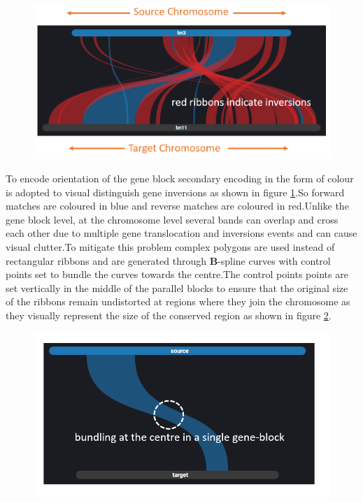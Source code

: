 \begin{figure}[h]
  \centering
  \includegraphics[width=.60\linewidth]{images/ch_4_link_plot_chromosome_a.PNG}
  \label{fig:ch_4_link_plot_chromosome_a}
\end{figure}


To encode orientation of the gene block secondary encoding in the form of colour is adopted to visual distinguish gene inversions as shown in figure \ref{fig:ch_4_link_plot_chromosome_a}.So forward matches are coloured in blue and reverse matches are coloured in red.Unlike the gene block level, at the chromosome level several bands can overlap and cross each other due to multiple gene translocation and inversions events and can cause visual clutter.To mitigate this problem complex polygons are used instead of rectangular ribbons and are generated through \textbf{B}-spline curves\cite{ref851370272} with control points set to bundle the curves towards the centre.The control points points are set vertically in the middle of the parallel blocks to ensure that the original size of the ribbons remain undistorted at regions where they join the chromosome as they visually represent the size of the conserved region as shown in figure \ref{fig:ch_4_link_plot_chromosome_b}. 

\begin{figure}
  \centering
  \includegraphics[width=.50\linewidth]{images/ch_4_link_plot_chromosome_b.PNG}
  \label{fig:ch_4_link_plot_chromosome_b}
\end{figure}



